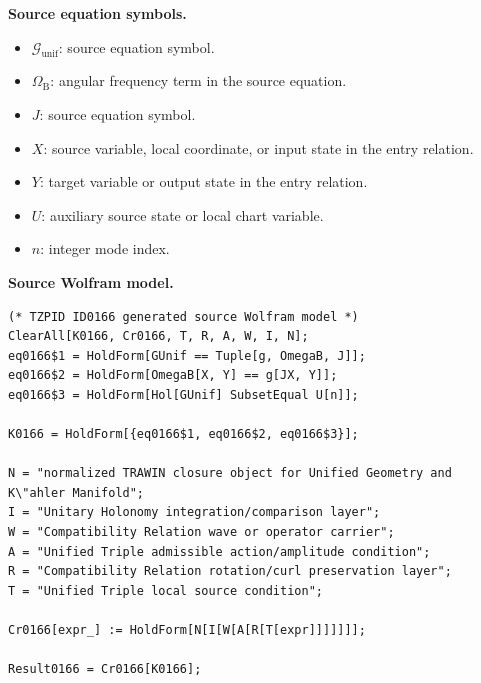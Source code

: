 \begin{minipage}[t]{0.49\linewidth}
\begingroup
\small
\raggedright
\textbf{Source equation symbols.}\par
\begin{itemize}[leftmargin=1.35em,itemsep=1pt,topsep=1pt,parsep=0pt]
    \item $\mathcal{G}_{\mathrm{unif}}$: source equation symbol.
    \item $\Omega_{\mathrm{B}}$: angular frequency term in the source equation.
    \item $J$: source equation symbol.
    \item $X$: source variable, local coordinate, or input state in the entry relation.
    \item $Y$: target variable or output state in the entry relation.
    \item $U$: auxiliary source state or local chart variable.
    \item $n$: integer mode index.
\end{itemize}
\endgroup
\end{minipage}\hfill
\begin{minipage}[t]{0.47\linewidth}
\begingroup
\scriptsize
\raggedright
\textbf{Source Wolfram model.}\par
\begin{Verbatim}[fontsize=\tiny,breaklines=true,breakanywhere=true]
(* TZPID ID0166 generated source Wolfram model *)
ClearAll[K0166, Cr0166, T, R, A, W, I, N];
eq0166$1 = HoldForm[GUnif == Tuple[g, OmegaB, J]];
eq0166$2 = HoldForm[OmegaB[X, Y] == g[JX, Y]];
eq0166$3 = HoldForm[Hol[GUnif] SubsetEqual U[n]];

K0166 = HoldForm[{eq0166$1, eq0166$2, eq0166$3}];

N = "normalized TRAWIN closure object for Unified Geometry and K\"ahler Manifold";
I = "Unitary Holonomy integration/comparison layer";
W = "Compatibility Relation wave or operator carrier";
A = "Unified Triple admissible action/amplitude condition";
R = "Compatibility Relation rotation/curl preservation layer";
T = "Unified Triple local source condition";

Cr0166[expr_] := HoldForm[N[I[W[A[R[T[expr]]]]]]];

Result0166 = Cr0166[K0166];
\end{Verbatim}
\endgroup
\end{minipage}

